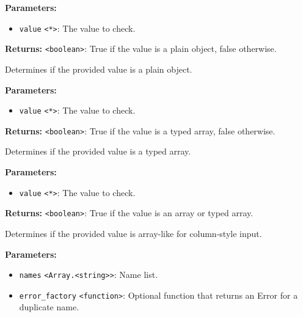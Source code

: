 \documentclass[12pt,a4paper]{article}
\begin{document}
\noindent \textbf{Parameters:}
\begin{itemize}
  \item \texttt{value} \texttt{<*>}: The value to check.
\end{itemize}

\noindent \textbf{Returns:} \texttt{<boolean>}: True if the value is a plain object, false otherwise.

\noindent Determines if the provided value is a plain object.

\vspace{5mm}
\noindent {}


\noindent \textbf{Parameters:}
\begin{itemize}
  \item \texttt{value} \texttt{<*>}: The value to check.
\end{itemize}

\noindent \textbf{Returns:} \texttt{<boolean>}: True if the value is a typed array, false otherwise.

\noindent Determines if the provided value is a typed array.

\vspace{5mm}
\noindent {}


\noindent \textbf{Parameters:}
\begin{itemize}
  \item \texttt{value} \texttt{<*>}: The value to check.
\end{itemize}

\noindent \textbf{Returns:} \texttt{<boolean>}: True if the value is an array or typed array.

\noindent Determines if the provided value is array-like for column-style input.

\vspace{5mm}
\noindent {}


\noindent \textbf{Parameters:}
\begin{itemize}
  \item \texttt{names} \texttt{<Array.<string>>}: Name list.
  \item \texttt{error\_factory} \texttt{<function>}: Optional function that returns an Error for a duplicate name.
\end{itemize}
\end{document}
